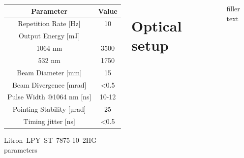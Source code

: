 \documentclass[20pt,margin=1in,innermargin=-4.5in,blockverticalspace=-0.25in]{tikzposter}
\begin{document}
\begin{columns}
{    %
 

    \vspace{1em}

    \begin{center}  

    \begin{threeparttable}
        \centering
        \begin{tabular}{|c | c|} 
        \hline
            \textbf{Parameter} & \textbf{Value} \\ [0.5ex] 
        \hline
        Repetition Rate [Hz] & 10  \\ 
        \hline
            Output Energy [mJ] & \\
            1064 nm & 3500  \\
            532 nm & 1750 \\
        \hline
            Beam Diameter [mm] & 15  \\
        \hline
            Beam Divergence [mrad] & \textless 0.5  \\ 
        \hline
            Pulse Width @1064 nm [ns] & 10-12 \\
        \hline
            Pointing Stability [µrad] & 25  \\
        \hline
            Timing jitter [ns] & \textless 0.5  \\
        \hline
        \end{tabular}

        \caption[Litron~LPY~ST~7875-10~2HG parameters]{Litron~LPY~ST~7875-10~2HG parameters \protect\cite{litronmanual}}
        
       
    \end{threeparttable}

    \label{tab:litronparameters}
    \end{center}

    \section*{Optical setup}
    filler text



}
\end{columns}
\end{document}
